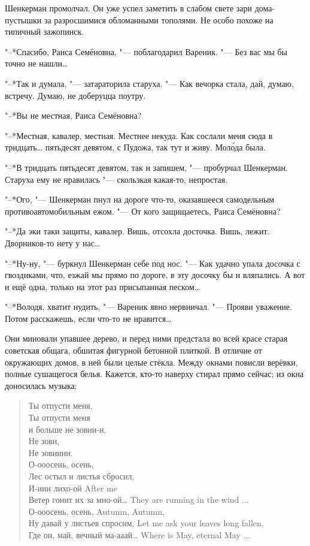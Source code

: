 Шенкерман промолчал.
Он уже успел заметить в слабом свете зари дома-пустышки за разросшимися обломанными тополями.
Не особо похоже на типичный зажопинск.

\asterism

\textspace

"--*Спасибо, Раиса Семёновна, "--- поблагодарил Вареник.
"--- Без вас мы бы точно не нашли\dots{}

"--*Так и думала, "--- затараторила старуха.
"--- Как вечорка стала, дай, думаю, встречу.
Думаю, не доберуцца поутру.

"--*Вы не местная, Раиса Семёновна?

"--*Местная, кавалер, местная.
Местнее некуда.
Как сослали меня сюда в тридцать\dots{} пятьдесят девятом, с Пудожа, так тут и живу.
Мол\'ода была.

"--*В тридцать пятьдесят девятом, так и запишем, "--- пробурчал Шенкерман.
Старуха ему не нравилась "--- скользкая какая-то, непростая.

"--*Ого, "--- Шенкерман пнул на дороге что-то, оказавшееся самодельным противоавтомобильным ежом.
"--- От кого защищаетесь, Раиса Семёновна?

"--*Да эки таки защиты, кавалер.
Вишь, отсохла досточка.
Вишь, лежит.
Дворников-то нету у нас\dots{}

"--*Ну-ну, "--- буркнул Шенкерман себе под нос.
"--- Как удачно упала досочка с гвоздиками, что, езжай мы прямо по дороге, в эту досочку бы и вляпались.
А вот и ещё одна, только на этот раз присыпанная песком\dots{}

"--*Володя, хватит нудить, "--- Вареник явно нервничал.
"--- Прояви уважение.
Потом расскажешь, если что-то не нравится\dots{}

Они миновали упавшее дерево, и перед ними предстала во всей красе старая советская общага, обшитая фигурной бетонной плиткой.
В отличие от окружающих домов, в ней были целые стёкла.
Между окнами повисли верёвки, полные сушащегося белья.
Кажется, кто-то наверху стирал прямо сейчас;
из окна доносилась музыка:

\begin{quote}
Ты отпусти меня,\\
Ты отпусти меня\\
и больше не зовии-и,\\
Не зови,\\
Не зовииии.\\
О-ооосень, осень,\\
Лес остыл и листья сбросил,\\
{И-иии лихо-ой}
{After me}\\
{Ветер гонит их за мно-ой\dots}
{They are running in the wind ...}\\
{О-ооосень, осень,}
{Autumn, Autumn,}\\
{Ну давай у листьев спросим,}
{Let me ask your leaves long fallen,}\\
{Где он, май, вечный ма-ааай\dots}
{Where is May, eternal May ...}
\end{quote}

